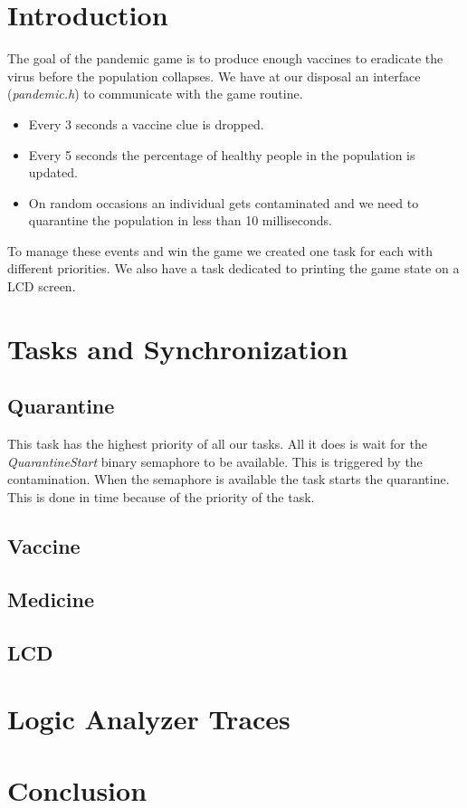 \documentclass[a4paper, twoside, 12pt]{article}
\begin{document}
\section{Introduction}
The goal of the pandemic game is to produce enough vaccines to eradicate the virus
before the population collapses. We have at our disposal an interface (\textit{pandemic.h})
to communicate with the game routine.\\
\begin{itemize}
	\item Every 3 seconds a vaccine clue is dropped.
	\item Every 5 seconds the percentage of healthy people in the population is updated.
	\item On random occasions an individual gets contaminated and we need to quarantine
	      the population in less than 10 milliseconds.
\end{itemize}
To manage these events and win the game we created one task for each with different
priorities. We also have a task dedicated to printing the game state on a LCD screen.

\section{Tasks and Synchronization}
\subsection{Quarantine}
This task has the highest priority of all our tasks. All it does is wait for the
\textit{QuarantineStart} binary semaphore to be available. This is triggered by the contamination.
When the semaphore is available the task starts the quarantine. This is done in time because
of the priority of the task.

\subsection{Vaccine}

\subsection{Medicine}
\subsection{LCD}

\section{Logic Analyzer Traces}

\section{Conclusion}

\nocite{*}
\end{document}
